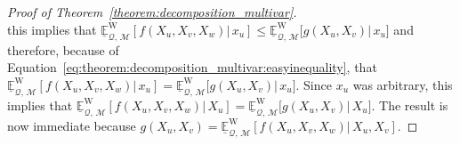 \documentclass[10pt,a4paper]{paper}
\theoremstyle{definition}
\newcommand{\states}{\mathcal{X}}
\newcommand{\processes}{\mathbb{P}}
\newcommand{\wprocesses}{\processes^{\mathrm{W}}}
\newcommand{\rateset}{\mathcal{Q}}
\newcommand{\abs}[1]{\left\vert #1 \right\vert}
\newcommand{\coloneqq}{:\!=}
\begin{document}
\begin{proof}[Proof of Theorem~\ref{theorem:decomposition_multivar}]
\begin{equation*}
\end{equation*}
this implies that
$\underline{\mathbb{E}}^{\mathrm{W}}_{\rateset,\,\mathcal{M}}\left[f(X_u,X_v,X_w)\vert\,x_u\right]\leq\underline{\mathbb{E}}^{\mathrm{W}}_{\rateset,\,\mathcal{M}}\bigl[g(X_u,X_v)\big\vert\,x_u\bigr]$ and therefore, because of Equation~\eqref{eq:theorem:decomposition_multivar:easyinequality}, that $\underline{\mathbb{E}}^{\mathrm{W}}_{\rateset,\,\mathcal{M}}\left[f(X_u,X_v,X_w)\vert\,x_u\right]=\underline{\mathbb{E}}^{\mathrm{W}}_{\rateset,\,\mathcal{M}}\bigl[g(X_u,X_v)\big\vert\,x_u\bigr]$. Since $x_u$ was arbitrary, this implies that $\underline{\mathbb{E}}^{\mathrm{W}}_{\rateset,\,\mathcal{M}}\left[f(X_u,X_v,X_w)\vert\,X_u\right]=\underline{\mathbb{E}}^{\mathrm{W}}_{\rateset,\,\mathcal{M}}\bigl[g(X_u,X_v)\big\vert\,X_u\bigr]$. The result is now immediate because $g(X_u,X_v)=\underline{\mathbb{E}}^{\mathrm{W}}_{\rateset,\,\mathcal{M}}\left[f(X_u,X_v,X_w)\vert\,X_u,X_v\right]$. 

\end{proof}
\end{document}
